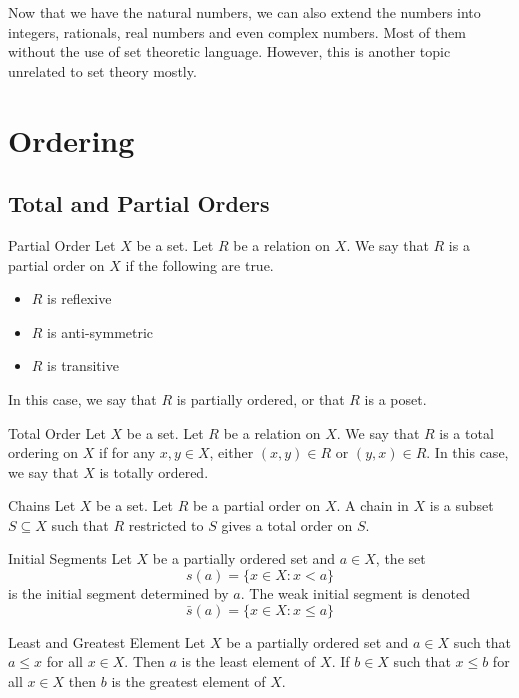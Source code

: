 \documentclass[a4paper]{article}
\begin{document}
Now that we have the natural numbers, we can also extend the numbers into integers, rationals, real numbers and even complex numbers. Most of them without the use of set theoretic language. However, this is another topic unrelated to set theory mostly. 

\pagebreak
\section{Ordering}
\subsection{Total and Partial Orders}
\begin{defn}{Partial Order}{} Let $X$ be a set. Let $R$ be a relation on $X$. We say that $R$ is a partial order on $X$ if the following are true. 
\begin{itemize}
\item $R$ is reflexive
\item $R$ is anti-symmetric
\item $R$ is transitive
\end{itemize}
In this case, we say that $R$ is partially ordered, or that $R$ is a poset. 
\end{defn}

\begin{defn}{Total Order}{} Let $X$ be a set. Let $R$ be a relation on $X$. We say that $R$ is a total ordering on $X$ if for any $x,y\in X$, either $(x,y)\in R$ or $(y,x)\in R$. In this case, we say that $X$ is totally ordered. 
\end{defn}

\begin{defn}{Chains}{} Let $X$ be a set. Let $R$ be a partial order on $X$. A chain in $X$ is a subset $S\subseteq X$ such that $R$ restricted to $S$ gives a total order on $S$. 
\end{defn}

\begin{defn}{Initial Segments}{} Let $X$ be a partially ordered set and $a\in X$, the set $$s(a)=\{x\in X:x<a\}$$ is the initial segment determined by $a$. The weak initial segment is denoted $$\bar{s}(a)=\{x\in X:x\leq a\}$$ 
\end{defn}

\begin{defn}{Least and Greatest Element}{} Let $X$ be a partially ordered set and $a\in X$ such that $a\leq x$ for all $x\in X$. Then $a$ is the least element of $X$. If $b\in X$ such that $x\leq b$ for all $x\in X$ then $b$ is the greatest element of $X$. 
\end{defn}
\end{document}
